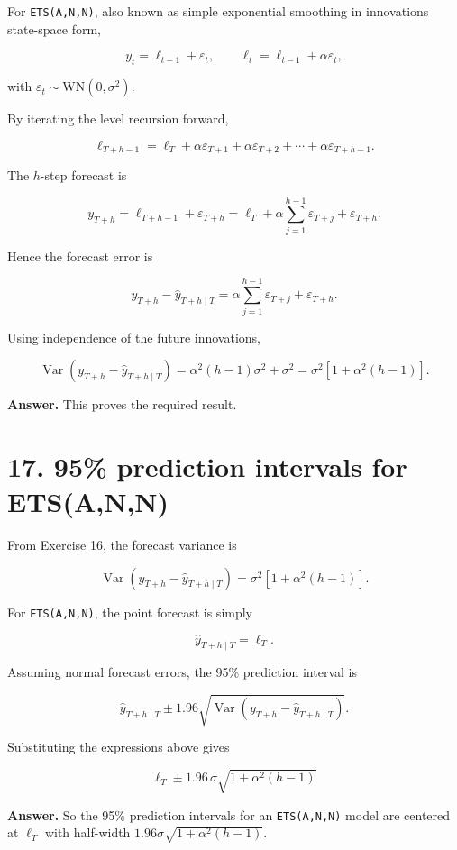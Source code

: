 \documentclass[
  11pt,
]{article}
\begin{document}
For \texttt{ETS(A,N,N)}, also known as simple exponential smoothing in
innovations state-space form,

\[
y_t = \ell_{t-1} + \varepsilon_t,
\qquad
\ell_t = \ell_{t-1} + \alpha \varepsilon_t,
\]

with \(\varepsilon_t \sim \text{WN}(0,\sigma^2)\).

By iterating the level recursion forward,

\[
\ell_{T+h-1} = \ell_T + \alpha\varepsilon_{T+1} + \alpha\varepsilon_{T+2} + \cdots + \alpha\varepsilon_{T+h-1}.
\]

The \(h\)-step forecast is

\[
y_{T+h} = \ell_{T+h-1} + \varepsilon_{T+h}
= \ell_T + \alpha\sum_{j=1}^{h-1}\varepsilon_{T+j} + \varepsilon_{T+h}.
\]

Hence the forecast error is

\[
y_{T+h} - \hat y_{T+h\mid T}
= \alpha\sum_{j=1}^{h-1}\varepsilon_{T+j} + \varepsilon_{T+h}.
\]

Using independence of the future innovations,

\[
\operatorname{Var}(y_{T+h} - \hat y_{T+h\mid T})
= \alpha^2(h-1)\sigma^2 + \sigma^2
= \sigma^2\left[1 + \alpha^2(h-1)\right].
\]

\textbf{Answer.} This proves the required result.

\section{17. 95\% prediction intervals for
ETS(A,N,N)}\label{prediction-intervals-for-etsann}

From Exercise 16, the forecast variance is

\[
\operatorname{Var}(y_{T+h} - \hat y_{T+h\mid T}) = \sigma^2\left[1 + \alpha^2(h-1)\right].
\]

For \texttt{ETS(A,N,N)}, the point forecast is simply

\[
\hat y_{T+h\mid T} = \ell_T.
\]

Assuming normal forecast errors, the 95\% prediction interval is

\[
\hat y_{T+h\mid T} \pm 1.96\sqrt{\operatorname{Var}(y_{T+h} - \hat y_{T+h\mid T})}.
\]

Substituting the expressions above gives

\[
\boxed{
\ell_T \pm 1.96\,\sigma\sqrt{1 + \alpha^2(h-1)}
}
\]

\textbf{Answer.} So the 95\% prediction intervals for an
\texttt{ETS(A,N,N)} model are centered at \(\ell_T\) with half-width
\(1.96\sigma\sqrt{1 + \alpha^2(h-1)}\).
\end{document}
